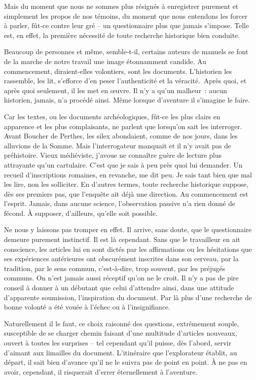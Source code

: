 \documentclass[french,twoside]{book} %
\newcommand{\astermono}{\medskip\centerline{\color{rubric}\large\selectfont{\syms ✻}}\medskip\par}%
\begin{document}
\astermono

\noindent  {}
\label{p26} Mais du moment que nous ne sommes plus résignés à enregistrer pure­ment et simplement les propos de nos témoins, du moment que nous entendons les forcer à parler, fût‑ce contre leur gré – un questionnaire plus que jamais s’impose. Telle est, en effet, la première nécessité de toute recherche historique bien conduite.\par
Beaucoup de personnes et même, semble‑t‑il, certains auteurs de manuels se font de la marche de notre travail une image étonnamment candide. Au commencement, diraient‑elles volontiers, sont les documents. L’histo­rien les rassemble, les lit, s’efforce d’en peser l’authenticité et la véracité. Après quoi, et après quoi seulement, il les met en œuvre. Il n’y a qu’un malheur : aucun historien, jamais, n’a procédé ainsi. Même lorsque d’aven­ture il s’imagine le faire.\par
Car les textes, ou les documents archéologiques, fût‑ce les plus clairs en apparence et les plus complaisants, ne parlent que lorsqu’on sait les interroger. Avant Boucher de Perthes, les silex abondaient, comme de nos jours, dans les alluvions de la Somme. Mais l’interrogateur manquait et il n’y avait pas de préhistoire. Vieux médiéviste, j’avoue ne connaître guère de lecture plus attrayante qu’un cartulaire. C’est que je sais à peu près quoi lui demander. Un recueil d’inscriptions romaines, en revanche, me dit peu. Je sais tant bien que mal les lire, non les solliciter. En d’autres termes, toute recherche historique suppose, dès ses premiers pas, que l’enquête ait déjà une direction. Au commencement est l’esprit. Jamais, dans aucune science, l’observation passive n’a rien donné de fécond. À supposer, d’ailleurs, qu’elle soit possible.\par
Ne nous y laissons pas tromper en effet. Il arrive, sans doute, que le questionnaire demeure purement instinctif. Il est là cependant. Sans que le travailleur en ait conscience, les articles lui en sont dictés par les affir­mations ou les hésitations que ses expériences antérieures ont obscuré­ment inscrites dans son cerveau, par la tradition, par le sens commun, c’est‑à‑dire, trop souvent, par les préjugés communs. On n’est jamais aussi réceptif qu’on ne le croit. Il n’y a pas de pire conseil à donner à un débutant que celui d’attendre ainsi, dans une attitude d’apparente sou­mission, l’inspiration du document. Par là plus d’une recherche de bonne volonté a été vouée à l’échec ou à l’insignifiance.\par
Naturellement il le faut, ce choix raisonné des questions, extrêmement souple, susceptible de se charger chemin faisant d’une multitude d’articles nouveaux, ouvert à toutes les surprises – tel cependant qu’il puisse, dès l’abord, servir d’aimant aux limailles du document. L’itinéraire que l’explorateur établit, au départ, il sait bien d’avance qu’il ne le suivra pas de point en point. À ne pas en avoir, cependant, il risquerait d’errer éternellement à l’aventure.\par
\end{document}
